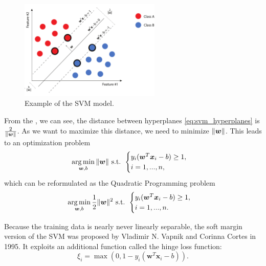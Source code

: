 \begin{figure}[ht!]
    \centering
    \includegraphics[width=0.6\textwidth]{Figures/svm/hyperplane_svm.pdf}
    \caption[Example of the SVM model.]{Example of the SVM model. \cite{Kruzik2018}}
    \label{fig:svm-margin}
\end{figure}

From the , we can see, the distance between hyperplanes \eqref{eq:svm_hyperplanes} is \( \frac{2}{\left\lVert\boldsymbol{w}\right\rVert} \). As we want to maximize this distance, we need to minimize $\left\lVert\boldsymbol{w}\right\rVert$. This leads to an optimization problem
\begin{equation}
    \operatorname*{arg\,min}_{\boldsymbol{w},b} \|\boldsymbol{w}\| \text{ s.t. }
    \begin{cases}
        y_i(\boldsymbol{w}^T\boldsymbol{x}_i-b)\geq1,\\
        i=1, ...,n,
    \end{cases}
\end{equation}
which can be reformulated as the Quadratic Programming problem
\begin{equation}
    \operatorname*{arg\,min}_{\boldsymbol{w},b} \frac{1}{2}\|\boldsymbol{w}\|^2 \text{ s.t. }
    \begin{cases}
        y_i(\boldsymbol{w}^T\boldsymbol{x}_i-b)\geq1,\\
        i=1, ...,n.
    \end{cases}
    \label{eq:svm_hard_margin_minimization}
\end{equation}

Because the training data is nearly never linearly separable, the soft margin version of the SVM was proposed by Vladimir N. Vapnik and Corinna Cortes \cite{Cortes1995} in 1995. It exploits an additional function called the hinge loss function:
\begin{equation}
    \xi_i = \max(0, 1-y_i(\boldsymbol{w}^T\boldsymbol{x}_i-b)).
    \label{eq:svm_hinge_loss}
\end{equation}

